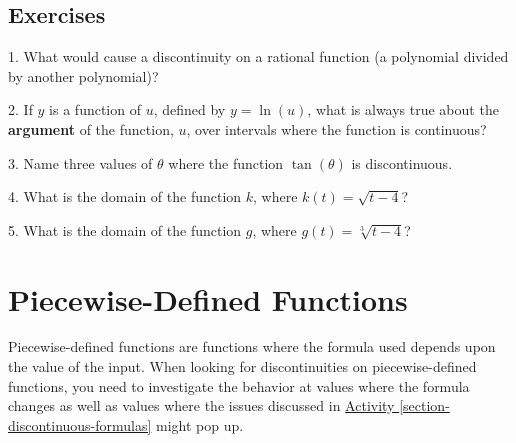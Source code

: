 \documentclass[10pt,oneside,]{book}
\newcommand{\terminology}[1]{\textbf{#1}}
\theoremstyle{plain}
\theoremstyle{definition}
\numberwithin{equation}{section}
\newcommand{\fe}[2]{#1\mathopen{}\left(#2\right)\mathclose{}}
\begin{document}
\subsection[Exercises]{Exercises}\label{exercises-16}
\begin{exerciselist}
\item[1.]\hypertarget{exercise-124}{\null}What would cause a discontinuity on a rational function (a polynomial divided by another polynomial)?%
\par\smallskip
\item[2.]\hypertarget{exercise-125}{\null}If \(y\) is a function of \(u\), defined by \(y=\fe{\ln}{u}\), what is always true about the \terminology{argument} of the function, \(u\), over intervals where the function is continuous?%
\par\smallskip
\item[3.]\hypertarget{exercise-126}{\null}Name three values of \(\theta\) where the function \(\fe{\tan}{\theta}\) is discontinuous.%
\par\smallskip
\item[4.]\hypertarget{exercise-127}{\null}What is the domain of the function \(k\), where \(\fe{k}{t}=\sqrt{t-4}\)?%
\par\smallskip
\item[5.]\hypertarget{exercise-128}{\null}What is the domain of the function \(g\), where \(\fe{g}{t}=\sqrt[3]{t-4}\)?%
\par\smallskip
\end{exerciselist}
\typeout{************************************************}
\typeout{************************************************}
\section[Piecewise-Defined Functions]{Piecewise-Defined Functions}\label{section-piecewise-defined-functions}
Piecewise-defined functions are functions where the formula used depends upon the value of the input. When looking for discontinuities on piecewise-defined functions, you need to investigate the behavior at values where the formula changes as well as values where the issues discussed in \hyperref[section-discontinuous-formulas]{Activity \ref{section-discontinuous-formulas}} might pop up.%
\typeout{************************************************}
\typeout{************************************************}
\end{document}
